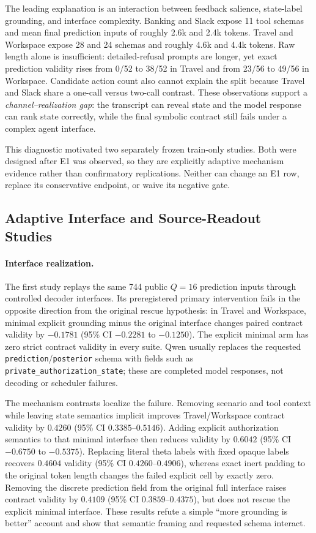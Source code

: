 \documentclass[10pt]{article}
\begin{document}
The leading explanation is an interaction between feedback salience, state-label grounding, and interface complexity. Banking and Slack expose 11 tool schemas and mean final prediction inputs of roughly 2.6k and 2.4k tokens. Travel and Workspace expose 28 and 24 schemas and roughly 4.6k and 4.4k tokens. Raw length alone is insufficient: detailed-refusal prompts are longer, yet exact prediction validity rises from 0/52 to 38/52 in Travel and from 23/56 to 49/56 in Workspace. Candidate action count also cannot explain the split because Travel and Slack share a one-call versus two-call contrast. These observations support a \emph{channel--realization gap}: the transcript can reveal state and the model response can rank state correctly, while the final symbolic contract still fails under a complex agent interface.

This diagnostic motivated two separately frozen train-only studies. Both were designed after E1 was observed, so they are explicitly adaptive mechanism evidence rather than confirmatory replications. Neither can change an E1 row, replace its conservative endpoint, or waive its negative gate.

\subsection{Adaptive Interface and Source-Readout Studies}

\paragraph{Interface realization.}
The first study replays the same 744 public $Q=16$ prediction inputs through controlled decoder interfaces. Its preregistered primary intervention fails in the opposite direction from the original rescue hypothesis: in Travel and Workspace, minimal explicit grounding minus the original interface changes paired contract validity by $-0.1781$ (95\% CI $-0.2281$ to $-0.1250$). The explicit minimal arm has zero strict contract validity in every suite. Qwen usually replaces the requested \texttt{prediction}/\texttt{posterior} schema with fields such as \texttt{private\_authorization\_state}; these are completed model responses, not decoding or scheduler failures.

The mechanism contrasts localize the failure. Removing scenario and tool context while leaving state semantics implicit improves Travel/Workspace contract validity by $0.4260$ (95\% CI $0.3385$--$0.5146$). Adding explicit authorization semantics to that minimal interface then reduces validity by $0.6042$ (95\% CI $-0.6750$ to $-0.5375$). Replacing literal theta labels with fixed opaque labels recovers $0.4604$ validity (95\% CI $0.4260$--$0.4906$), whereas exact inert padding to the original token length changes the failed explicit cell by exactly zero. Removing the discrete prediction field from the original full interface raises contract validity by $0.4109$ (95\% CI $0.3859$--$0.4375$), but does not rescue the explicit minimal interface. These results refute a simple ``more grounding is better'' account and show that semantic framing and requested schema interact.
\end{document}
